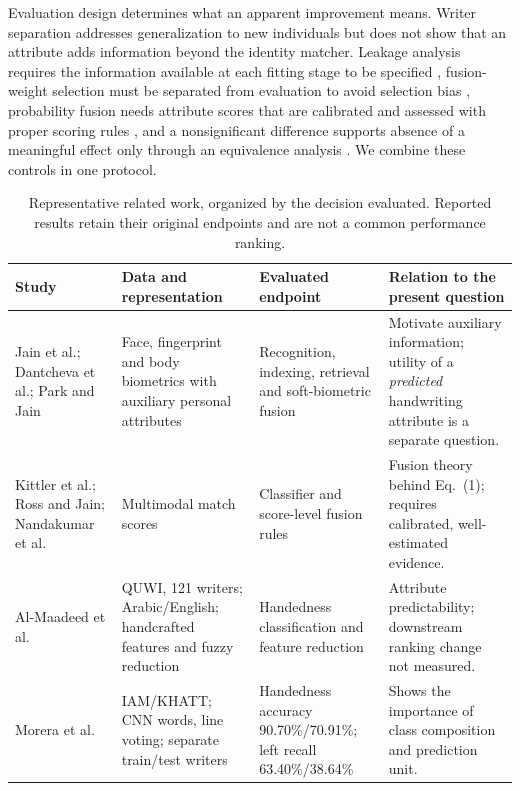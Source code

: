 Evaluation design determines what an apparent improvement means. Writer separation addresses generalization to new individuals but does not show that an attribute adds information beyond the identity matcher. Leakage analysis requires the information available at each fitting stage to be specified \cite{kaufman2012leakage}, fusion-weight selection must be separated from evaluation to avoid selection bias \cite{varma2006bias,cawley2010selection}, probability fusion needs attribute scores that are calibrated and assessed with proper scoring rules \cite{gneiting2007scoring,guo2017calibration}, and a nonsignificant difference supports absence of a meaningful effect only through an equivalence analysis \cite{lakens2017equivalence}. We combine these controls in one protocol.

\begin{table}[!t]
\caption{Representative related work, organized by the decision evaluated. Reported results retain their original endpoints and are not a common performance ranking.}\label{tab:related}
\centering
\begin{tabularx}{\textwidth}{@{}>{\raggedright\arraybackslash}p{}>{\raggedright\arraybackslash}p{}>{\raggedright\arraybackslash}p{}>{\raggedright\arraybackslash}X@{}}\toprule
Study & Data and representation & Evaluated endpoint & Relation to the present question\\\midrule
Jain et al.; Dantcheva et al.; Park and Jain \cite{jain2004soft,jain2004integrating,dantcheva2011bag,dantcheva2016soft,park2010soft} & Face, fingerprint and body biometrics with auxiliary personal attributes & Recognition, indexing, retrieval and soft-biometric fusion & Motivate auxiliary information; utility of a \emph{predicted} handwriting attribute is a separate question.\\
Kittler et al.; Ross and Jain; Nandakumar et al.\ \cite{kittler1998combining,ross2003fusion,nandakumar2008likelihood} & Multimodal match scores & Classifier and score-level fusion rules & Fusion theory behind Eq.~(1); requires calibrated, well-estimated evidence.\\
Al-Maadeed et al.\ \cite{almaadeed2016handedness} & QUWI, 121 writers; Arabic/English; handcrafted features and fuzzy reduction & Handedness classification and feature reduction & Attribute predictability; downstream ranking change not measured.\\
Morera et al.\ \cite{morera2018handedness} & IAM/KHATT; CNN words, line voting; separate train/test writers & Handedness accuracy 90.70\%/70.91\%; left recall 63.40\%/38.64\% & Shows the importance of class composition and prediction unit.\\

\end{tabularx}
\end{table}
